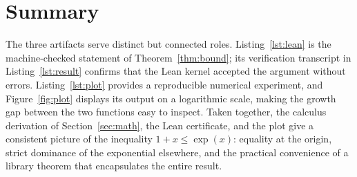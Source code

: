 \documentclass[11pt,a4paper]{article}
\theoremstyle{plain}
\begin{document}
\section{Summary}
\label{sec:summary}

The three artifacts serve distinct but connected roles.  Listing~\ref{lst:lean}
is the machine-checked statement of Theorem~\ref{thm:bound}; its
verification transcript in Listing~\ref{lst:result} confirms that the Lean
kernel accepted the argument without errors.  Listing~\ref{lst:plot}
provides a reproducible numerical experiment, and Figure~\ref{fig:plot}
displays its output on a logarithmic scale, making the growth gap between
the two functions easy to inspect.  Taken together, the calculus derivation
of Section~\ref{sec:math}, the Lean certificate, and the plot give a
consistent picture of the inequality $1+x\leq\exp(x)$: equality at the
origin, strict dominance of the exponential elsewhere, and the practical
convenience of a library theorem that encapsulates the entire result.



\end{document}
